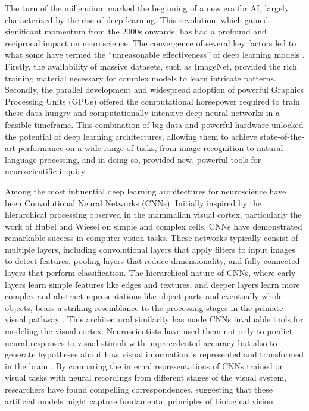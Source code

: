 \documentclass[11pt,a4paper]{article}
\begin{document}
The turn of the millennium marked the beginning of a new era for AI, largely characterized by the rise of deep learning. This revolution, which gained significant momentum from the 2000s onwards, has had a profound and reciprocal impact on neuroscience. The convergence of several key factors led to what some have termed the ``unreasonable effectiveness'' of deep learning models \cite{lecun2015deep}. Firstly, the availability of massive datasets, such as ImageNet, provided the rich training material necessary for complex models to learn intricate patterns. Secondly, the parallel development and widespread adoption of powerful Graphics Processing Units (GPUs) offered the computational horsepower required to train these data-hungry and computationally intensive deep neural networks in a feasible timeframe. This combination of big data and powerful hardware unlocked the potential of deep learning architectures, allowing them to achieve state-of-the-art performance on a wide range of tasks, from image recognition to natural language processing, and in doing so, provided new, powerful tools for neuroscientific inquiry \cite{richards2019deep}.

Among the most influential deep learning architectures for neuroscience have been Convolutional Neural Networks (CNNs). Initially inspired by the hierarchical processing observed in the mammalian visual cortex, particularly the work of Hubel and Wiesel on simple and complex cells, CNNs have demonstrated remarkable success in computer vision tasks. These networks typically consist of multiple layers, including convolutional layers that apply filters to input images to detect features, pooling layers that reduce dimensionality, and fully connected layers that perform classification. The hierarchical nature of CNNs, where early layers learn simple features like edges and textures, and deeper layers learn more complex and abstract representations like object parts and eventually whole objects, bears a striking resemblance to the processing stages in the primate visual pathway \cite{yamins2016using}. This architectural similarity has made CNNs invaluable tools for modeling the visual cortex. Neuroscientists have used them not only to predict neural responses to visual stimuli with unprecedented accuracy but also to generate hypotheses about how visual information is represented and transformed in the brain \cite{kriegeskorte2018cognitive, savage2019how}. By comparing the internal representations of CNNs trained on visual tasks with neural recordings from different stages of the visual system, researchers have found compelling correspondences, suggesting that these artificial models might capture fundamental principles of biological vision.
\end{document}
